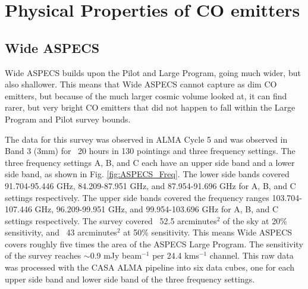 \chapter{Physical Properties of CO emitters}

\section{Wide ASPECS}

Wide ASPECS builds upon the Pilot and Large Program, going much wider, but also shallower. This means that Wide ASPECS cannot capture as dim CO emitters, but because of the much larger cosmic volume looked at, it can find rarer, but very bright CO emitters that did not happen to fall within the Large Program and Pilot survey bounds.

The data for this survey was observed in ALMA Cycle 5 and was observed in Band 3 (3mm) for ~20 hours in 130 pointings and three frequency settings. The three frequency settings A, B, and C each have an upper side band and a lower side band, as shown in Fig. \ref{fig:ASPECS_Freq}. The lower side bands covered 91.704-95.446 GHz, 84.209-87.951 GHz, and 87.954-91.696 GHz for A, B, and C settings respectively. The upper side bands covered the frequency ranges 103.704-107.446 GHz, 96.209-99.951 GHz, and 99.954-103.696 GHz for A, B, and C settings respectively. The survey covered ~52.5 arcminutes$^2$ of the sky at 20\% sensitivity, and ~43 arcminutes$^2$ at 50\% sensitivity. This means Wide ASPECS covers roughly five times the area of the ASPECS Large Program. The sensitivity of the survey reaches $\sim$0.9 mJy beam$^{-1}$ per 24.4 kms$^{-1}$ channel. This raw data was processed with the CASA ALMA pipeline into six data cubes, one for each upper side band and lower side band of the three frequency settings.

